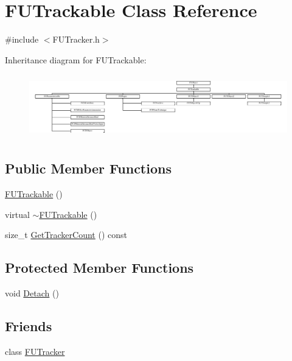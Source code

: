 \hypertarget{classFUTrackable}{
\section{FUTrackable Class Reference}
\label{classFUTrackable}
}


{\ttfamily \#include $<$FUTracker.h$>$}

Inheritance diagram for FUTrackable:\begin{figure}[H]
\begin{center}
\leavevmode
\includegraphics[height=2.807017cm]{classFUTrackable}
\end{center}
\end{figure}
\subsection*{Public Member Functions}
\begin{DoxyCompactItemize}
\item 
\hyperlink{classFUTrackable_ae16839d1faba9988e533d75bc3efe745}{FUTrackable} ()
\item 
virtual \hyperlink{classFUTrackable_a42f3a1b4ff41e5a5c754bc9e262ed65b}{$\sim$FUTrackable} ()
\item 
size\_\-t \hyperlink{classFUTrackable_a1319f3312646d5f32dcf7530b14c8723}{GetTrackerCount} () const 
\end{DoxyCompactItemize}
\subsection*{Protected Member Functions}
\begin{DoxyCompactItemize}
\item 
void \hyperlink{classFUTrackable_a2730c931df5604cd68ce8e9da1cdb320}{Detach} ()
\end{DoxyCompactItemize}
\subsection*{Friends}
\begin{DoxyCompactItemize}
\item 
\hypertarget{classFUTrackable_ae6031a8f421fb7788e4de571ced6238c}{
class \hyperlink{classFUTrackable_ae6031a8f421fb7788e4de571ced6238c}{FUTracker}}
\label{classFUTrackable_ae6031a8f421fb7788e4de571ced6238c}

\end{DoxyCompactItemize}


